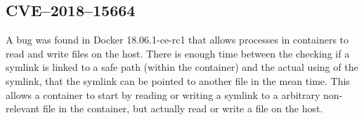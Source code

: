 \subsection{CVE--2018--15664}
A bug was found in Docker 18.06.1-ce-rc1 that allows processes in containers to read and write files on the host\cite{CVE-2018-15664-Openwall}\cite{CVE-2018-15664-Bugzilla}. There is enough time between the checking if a symlink is linked to a safe path (within the container) and the actual using of the symlink, that the symlink can be pointed to another file in the mean time. This allows a container to start by reading or writing a symlink to a arbitrary non-relevant file in the container, but actually read or write a file on the host.
